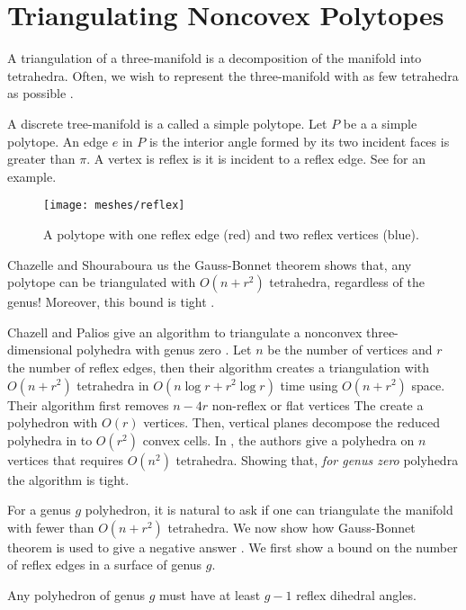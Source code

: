 \section{Triangulating Noncovex Polytopes}
\label{sec:triangulating}

A triangulation of a three-manifold is a decomposition
of the manifold into tetrahedra.
Often, we wish to represent the three-manifold
with as few tetrahedra as possible \cite{simplify-mesh-1999}.

A discrete tree-manifold is a called a simple polytope.
Let $P$ be a a simple polytope. An edge $e$ in $P$ is
 the interior angle formed by its two incident faces
is greater than $\pi$.
A vertex is reflex is it is incident to a reflex edge.
See  for an example.

\begin{figure}[htb]
\centering
\texttt{[image: meshes/reflex]}
\caption{A polytope with one reflex edge (red) and two reflex vertices (blue).}
\label{fig:reflex}
\end{figure}


Chazelle and Shouraboura us the 
 Gauss-Bonnet theorem shows that, any polytope
can be triangulated with $O(n+r^2)$ tetrahedra, regardless  of 
the genus! Moreover, this bound is tight \cite{tetra-bounds-c-s-1994}.


Chazell and Palios give an
algorithm to triangulate a nonconvex three-dimensional polyhedra with genus
zero \cite{triangulating-polytope-1990}.
Let $n$ be the number of vertices and $r$ the number of reflex edges,
then their algorithm creates a triangulation with $O(n+r^2)$ tetrahedra 
in $O(n\log r +r^2\log r)$ time using $O(n+r^2)$ space.
Their algorithm first removes $n-4r$ non-reflex or flat vertices
The create a polyhedron with $O(r)$ vertices.
Then, vertical planes decompose the reduced polyhedra in to
$O(r^2)$ convex cells.
In \cite{7}, the authors give a polyhedra on $n$ vertices that requires
$O(n^2)$ tetrahedra. Showing that, \emph{for genus zero} polyhedra
the algorithm is tight.


For a genus $g$ polyhedron, it is natural to ask if one can 
triangulate the manifold with fewer than $O(n+r^2)$ tetrahedra.
We now show how Gauss-Bonnet theorem is used to give a negative answer 
 \cite{tetra-bounds-c-s-1994}.
We first show a bound on the number of reflex edges
in a surface of genus $g$.


\begin{theorem}\label{thm:reflex}

Any polyhedron of genus $g$ must have 
at least $g-1$ reflex dihedral angles. 

\end{theorem}

